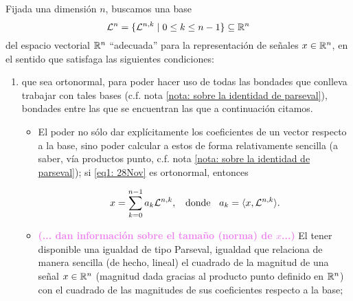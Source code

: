 \noindent 
\begin{listaObj}
\label{lista de objetivos}
Fijada una dimensión $n$, 
buscamos una base 
\begin{equation}
\label{eq1: 28Nov}
\mathcal{L}^{n}=\{ \mathcal{L}^{n,k} \hspace{0.1cm} |
\hspace{0.1cm} 0 \leq k \leq n-1  \} \subseteq \mathbb{R}^{n} 
\end{equation}
del espacio vectorial
$\mathbb{R}^{n}$ ``adecuada'' para la representación de señales
$x \in \mathbb{R}^{n}$,
en el sentido que satisfaga
las siguientes condiciones: 

\begin{enumerate}
\item 
que
sea ortonormal, para poder hacer uso de todas
las bondades que conlleva 
trabajar con tales bases
(c.f. nota \ref{nota: sobre la identidad de parseval}), 
bondades entre las que se encuentran
las que a continuación citamos.
\begin{itemize}
\item 
\textbf{}
El poder no sólo dar explícitamente los coeficientes
de un vector respecto a la base, 
sino poder calcular a estos
de forma relativamente sencilla (a saber, vía productos punto,
c.f. nota \ref{nota: sobre la identidad de parseval}); si
\eqref{eq1: 28Nov} es ortonormal, entonces

\begin{equation}
\label{eq2: 13Feb}
x= \sum\limits_{k=0}^{n-1}a_{k}\mathcal{L}^{n,k},
\hspace{0.2cm} \text{ donde } \hspace{0.2cm}
a_{k}= \langle x , \mathcal{L}^{n,k} \rangle.
\end{equation}
\item
\textbf{\textcolor{violet}{(... dan información sobre el tamaño (norma) de $x$...)}}
El tener disponible una igualdad de tipo Parseval, igualdad que
relaciona de manera sencilla (de hecho, lineal)
el cuadrado de
la magnitud de una señal $x \in \mathbb{R}^{n}$ (magnitud dada
gracias al producto punto definido en $\mathbb{R}^{n}$)
con el cuadrado de las magnitudes de sus coeficientes
respecto a la base;


\end{itemize}
\end{enumerate}
\end{listaObj}
